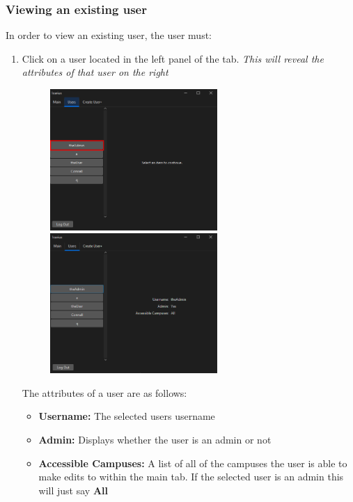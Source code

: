 \subsubsection{Viewing an existing user}
In order to view an existing user, the user must:
\begin{enumerate}
    \item Click on a user located in the left panel of the tab. \textit{This will reveal the attributes of that user on the right}
    \begin{figure}[H]
        \centering
        \includegraphics[width=0.6\textwidth]{UsersTab/viewUser/viewUser.png}
        \includegraphics[width=0.6\textwidth]{UsersTab/viewUser/viewUserSelected.png}
    \end{figure}
    The attributes of a user are as follows:
    \begin{itemize}
        \item \textbf{Username:} The selected users username
        \item \textbf{Admin:} Displays whether the user is an admin or not
        \item \textbf{Accessible Campuses:} A list of all of the campuses the user is able to make edits to within the main tab. If the selected user is an admin this will just say \textbf{All}
    \end{itemize}
\end{enumerate}


